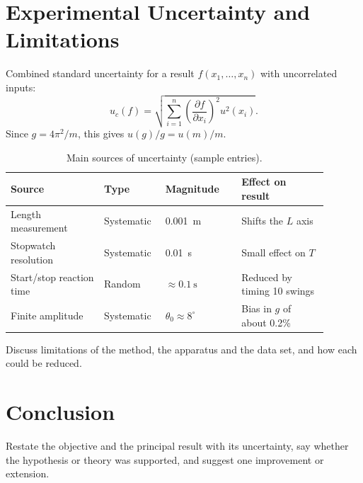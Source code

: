 \documentclass[12pt,a4paper]{article}
\newcommand{\ph}[1]{\textcolor{lpPlaceholder}{#1}}
\newcommand{\tblsetup}{\small\renewcommand{\arraystretch}{1.22}\arrayrulecolor{lpRule}}
\newcommand{\hdr}[1]{{\lpHeadingFont\bfseries\footnotesize #1}}
\begin{document}
\section{Experimental Uncertainty and Limitations}
Combined standard uncertainty for a result $f(x_1,\dots,x_n)$ with uncorrelated inputs:
\begin{equation}
  u_c(f) = \sqrt{\sum_{i=1}^{n}\left(\frac{\partial f}{\partial x_i}\right)^{2}u^{2}(x_i)} .
  \label{eq:uc}
\end{equation}
Since $g = 4\pi^{2}/m$, this gives $u(g)/g = u(m)/m$.

\begin{table}[H]
  \centering
  \caption{Main sources of uncertainty (sample entries).}
  \label{tab:uncertainty}
  \tblsetup
  \begin{tabular}{@{}p{0.27\linewidth}p{0.15\linewidth}p{0.22\linewidth}p{0.25\linewidth}@{}}
    \toprule\rowcolor{lpTableHead}
    \hdr{Source} & \hdr{Type} & \hdr{Magnitude} & \hdr{Effect on result} \\
    \midrule
    \ph{Length measurement}       & \ph{Systematic} & \ph{\SI{0.001}{\metre}} & \ph{Shifts the $L$ axis} \\
    \ph{Stopwatch resolution}     & \ph{Systematic} & \ph{\SI{0.01}{\second}} & \ph{Small effect on $T$} \\
    \ph{Start/stop reaction time} & \ph{Random}     & \ph{$\approx\SI{0.1}{\second}$} & \ph{Reduced by timing 10 swings} \\
    \ph{Finite amplitude}         & \ph{Systematic} & \ph{$\theta_0\approx 8^{\circ}$} & \ph{Bias in $g$ of about 0.2\%} \\
    \bottomrule
  \end{tabular}
\end{table}

\ph{Discuss limitations of the method, the apparatus and the data set, and how each could be reduced.}

\section{Conclusion}
\ph{Restate the objective and the principal result with its uncertainty, say whether the hypothesis or theory was
supported, and suggest one improvement or extension.}
\end{document}
